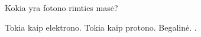 \question Kokia yra fotono rimties masė? \begin{choices}
    \choice Tokia kaip elektrono.
    \choice Tokia kaip protono.
    \choice Begalinė.
    .
\end{choices}